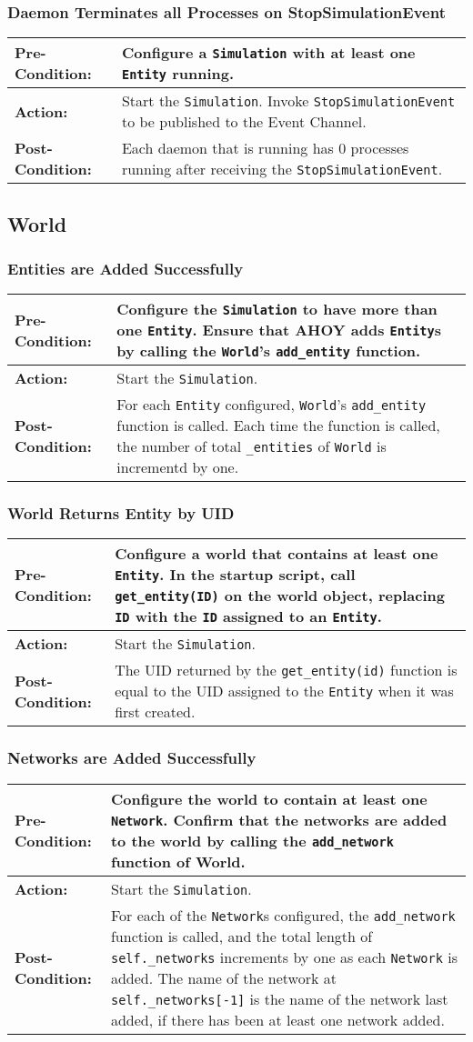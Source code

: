 \documentclass[titlepage]{article}
\newcommand{\testcase}[3]{
    \begin{center}
    \begin{tabular}{| l | p{0.7\textwidth}|}
        \hline
        \rowcolor[gray]{0.8}\textbf{Pre-Condition:} & #1 \\ \hline
        \textbf{Action:} & #2 \\ \hline
        \rowcolor[gray]{0.8}\textbf{Post-Condition:} & #3 \\ \hline
    \end{tabular}
    \end{center}
}
\begin{document}
\subsubsection{Daemon Terminates all Processes on StopSimulationEvent}
\testcase{Configure a \texttt{Simulation} with at least one \texttt{Entity} running.}{Start the \texttt{Simulation}. Invoke \texttt{StopSimulationEvent} to be published to the Event Channel.}{Each daemon that is running has 0 processes running after receiving the \texttt{StopSimulationEvent}.}

\subsection{World}
\subsubsection{Entities are Added Successfully}
\testcase{Configure the \texttt{Simulation} to have more than one \texttt{Entity}.  Ensure that AHOY adds \texttt{Entity}s by calling the \texttt{World}'s \texttt{add\_entity} function.}{Start the \texttt{Simulation}.}{For each \texttt{Entity} configured, \texttt{World}'s \texttt{add\_entity} function is called.  Each time the function is called, the number of total \texttt{_entities} of \texttt{World} is incrementd by one.}

\subsubsection{World Returns Entity by UID}
\testcase{Configure a world that contains at least one \texttt{Entity}. In the startup script, call \texttt{get\_entity(ID)} on the world object, replacing \texttt{ID} with the \texttt{ID} assigned to an \texttt{Entity}.}{Start the \texttt{Simulation}.}{The UID returned by the \texttt{get\_entity(id)} function is equal to the UID assigned to the \texttt{Entity} when it was first created.}

\subsubsection{Networks are Added Successfully}
\testcase{Configure the world to contain at least one \texttt{Network}.  Confirm that the networks are added to the world by calling the \texttt{add\_network} function of World.}{Start the \texttt{Simulation}.}{For each of the \texttt{Network}s configured, the \texttt{add\_network} function is called, and the total length of \texttt{self.\_networks} increments by one as each \texttt{Network} is added.  The name of the network at \texttt{self.\_networks[-1]} is the name of the network last added, if there has been at least one network added.}
\end{document}
